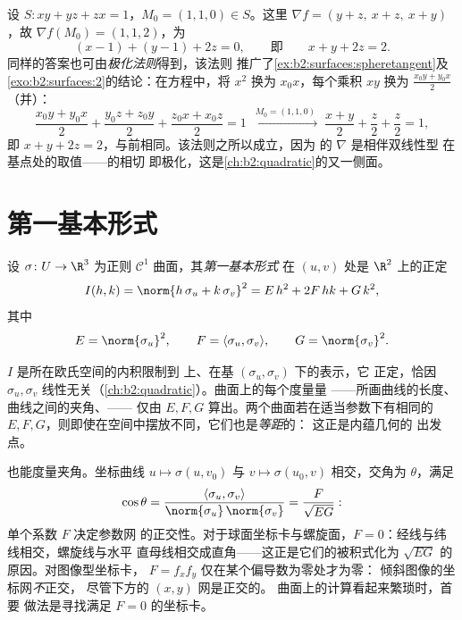 \begin{example}\label{ex:b2:surfaces:polarization}
设 $S : xy + yz + zx = 1$，$M_0 = (1, 1, 0) \in S$。这里
$\nabla f = (y + z,\ x + z,\ x + y)$，故 $\nabla f(M_0) = (1,
1, 2)$，为
\[
(x - 1) + (y - 1) + 2z = 0,
\qquad\text{即}\qquad x + y + 2z = 2 .
\]
同样的答案也可由\emph{极化法则}得到，该法则
推广了\cref{ex:b2:surfaces:spheretangent}及
\cref{exo:b2:surfaces:2}的结论：在方程中，将
$x^2$ 换为 $x_0x$，每个乘积 $xy$ 换为 $\frac{x_0y +
y_0x}2$（并）：
\[
\frac{x_0y + y_0x}2 + \frac{y_0z + z_0y}2 + \frac{z_0x +
x_0z}2 = 1
\;\xrightarrow{\ M_0 = (1,1,0)\ }\;
\frac{x + y}2 + \frac z2 + \frac z2 = 1 ,
\]
即 $x + y + 2z = 2$，与前相同。该法则之所以成立，因为
的 $\nabla$ 是相伴双线性型
在基点处的取值——的相切
即极化，这是\cref{ch:b2:quadratic}的又一侧面。
\end{example}

\section{第一基本形式}

\begin{definition}[第一基本形式]\label{def:b2:surfaces:fff}
设 $\sigma \colon U \to \R^3$ 为正则 $\mathcal{C}^1$
曲面，其\emph{第一基本形式}
在 $(u,v)$ 处是
$\R^2$ 上的正定
\[
I(h, k) = \norm{h\,\sigma_u + k\,\sigma_v}^2
= E\,h^2 + 2F\,hk + G\,k^2,
\]
其中
\[
E = \norm{\sigma_u}^2,
\qquad
F = \langle \sigma_u, \sigma_v\rangle,
\qquad
G = \norm{\sigma_v}^2 .
\]
\end{definition}

\begin{remark}
$I$ 是所在欧氏空间的内积限制到
上、在基 $(\sigma_u, \sigma_v)$ 下的表示，它
正定，恰因 $\sigma_u, \sigma_v$
线性无关（\cref{ch:b2:quadratic}）。曲面上的每个度量量
——所画曲线的长度、曲线之间的夹角、——
仅由 $E, F, G$ 算出。两个曲面若在适当参数下有相同的 $E,
F, G$，则即使在空间中摆放不同，它们也是\emph{等距}的：
这正是内蕴几何的
出发点。
\end{remark}

\begin{example}[坐标曲线间的
夹角]\label{ex:b2:surfaces:coordangle}
也能度量夹角。坐标曲线
$u \mapsto \sigma(u, v_0)$ 与 $v \mapsto
\sigma(u_0, v)$ 相交，交角为 $\theta$，满足
\[
\cos\theta = \frac{\langle\sigma_u,
\sigma_v\rangle}{\norm{\sigma_u}\,\norm{\sigma_v}}
= \frac{F}{\sqrt{EG}} :
\]
单个系数 $F$ 决定参数网
的正交性。对于球面坐标卡与螺旋面，$F =
0$：经线与纬线相交，螺旋线与水平
直母线相交成直角——这正是它们的被积式化为
$\sqrt{EG}$ 的原因。对图像型坐标卡，
$F = f_xf_y$ 仅在某个偏导数为零处才为零：
倾斜图像的坐标网\emph{不}正交，
尽管下方的 $(x, y)$ 网是正交的。
曲面上的计算看起来繁琐时，首要
做法是寻找满足 $F = 0$ 的坐标卡。
\end{example}

